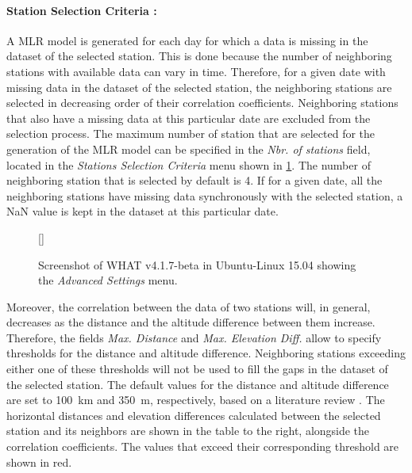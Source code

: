 \documentclass[WHATMANUAL.tex]{subfiles}
\begin{document}
\paragraph{Station Selection Criteria :} A MLR model is generated for each day for which a data is missing in the dataset of the selected station. This is done because the number of neighboring stations with available data can vary in time. Therefore, for a given date with missing data in the dataset of the selected station, the neighboring stations are selected in decreasing order of their correlation coefficients. Neighboring stations that also have a missing data at this particular date are excluded from the selection process. The maximum number of station that are selected for the generation of the MLR model can be specified in the \emph{Nbr. of stations} field, located in the \emph{Stations Selection Criteria} menu shown in \cref{fig:selection_criteria}. The number of neighboring station that is selected by default is 4. If for a given date, all the neighboring stations have missing data synchronously with the selected station, a NaN value is kept in the dataset at this particular date. 

\begin{figure}[!b]
    \setlength{\fboxsep}{0pt}
    [\FBwidth]
	{
	 \caption{Screenshot of WHAT v4.1.7-beta in Ubuntu-Linux 15.04 showing the \emph{Advanced Settings} menu.}
	 \label{fig:selection_criteria}
	}
	{
	}
\end{figure}

Moreover, the correlation between the data of two stations will, in general, decreases as the distance and the altitude difference between them increase. Therefore, the fields \emph{Max. Distance} and \emph{Max. Elevation Diff.} allow to specify thresholds for the distance and altitude difference. Neighboring stations exceeding either one of these thresholds will not be used to fill the gaps in the dataset of the selected station. The default values for the distance and altitude difference are set to \SI{100}{km} and \SI{350}{m}, respectively, based on a literature review \citep{tronci_comparison_1986,xia_forest_1999,simolo_improving_2010}. The horizontal distances and elevation differences calculated between the selected station and its neighbors are shown in the table to the right, alongside the correlation coefficients. The values that exceed their corresponding threshold are shown in red.
\end{document}
